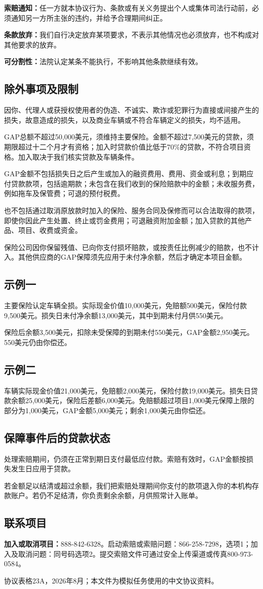 \documentclass[UTF8,fontset=none,11pt,a4paper]{ctexart}
\begin{document}
\textbf{索赔通知：}任一方就本协议行为、条款或有关义务提出个人或集体司法行动前，必须通知另一方所主张的违约，并给予合理期间纠正。


\textbf{条款放弃：}我们自行决定放弃某项要求，不表示其他情况也必须放弃，也不构成对其他要求的放弃。


\textbf{可分割性：}法院认定某条不能执行，不影响其他条款继续有效。


\subsection*{除外事项及限制}
因你、代理人或获授权使用者的伪造、不诚实、欺诈或犯罪行为直接或间接产生的损失，故意造成的损失，以及商业车辆或不符合车辆定义的损失，均不适用。


GAP总额不超过50,000美元，须维持主要保险。金额不超过7,500美元的贷款，须期限超过十二个月才有资格；加入时贷款价值比低于70\%的贷款，不符合项目资格。加入取决于我们核实贷款及车辆条件。


GAP金额不包括损失日之后产生或加入的融资费用、费用、资金或利息；到期应付贷款款项，包括逾期款；未包含在我们收到的保险赔款中的金额；未收服务费，例如拖车及保管费；可退的预付税费。


也不包括通过取消原放款时加入的保险、服务合同及保修而可以合法取得的款项，即使你因此产生处置、终止或罚金费用；可退融资附加金额；加入贷款的其他产品、项目、收费或资金。


保险公司因你保留残值、已向你支付损坏赔款，或按责任比例减少的赔款，也不计入。其他供应商的GAP保障须先应用于未付净余额，然后才确定本项目金额。


\subsection*{示例一}
主要保险认定车辆全损。实际现金价值10,000美元，免赔额500美元，保险付款9,500美元。损失日未付净余额13,000美元，其中到期未付月供550美元。


保险后余额3,500美元，扣除未受保障的到期未付550美元，GAP金额2,950美元。550美元仍由你偿还。


\subsection*{示例二}
车辆实际现金价值21,000美元，免赔额2,000美元，保险付款19,000美元。损失日贷款余额25,000美元，保险后差额6,000美元。免赔额超过项目1,000美元保障上限的部分为1,000美元，GAP金额5,000美元；剩余1,000美元由你偿还。


\subsection*{保障事件后的贷款状态}
处理索赔期间，仍须在正常到期日支付最低应付款。索赔有效时，GAP金额按损失发生日应用于贷款。


若金额足以结清或超过余额，我们把索赔处理期间你支付的款项退入你的本机构存款账户。若仍不足结清，你负责剩余余额，月供照常计入账单。


\subsection*{联系项目}
\textbf{加入或取消项目：}888-842-6328。启动索赔或索赔问题：866-258-7298，选项1；加入及取消问题：同号码选项2。提交索赔文件可通过安全上传渠道或传真800-973-0584。


协议表格23A，2026年8月；本文件为模拟任务使用的中文协议资料。
\end{document}
